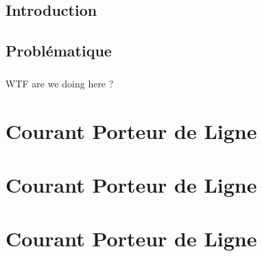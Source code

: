 
    \section{Introduction}
        \paragraph{}

    \section{Problématique}
        \paragraph{}
            WTF are we doing here ?

\chapter{Courant Porteur de Ligne}

\chapter{Courant Porteur de Ligne}

\chapter{Courant Porteur de Ligne}
